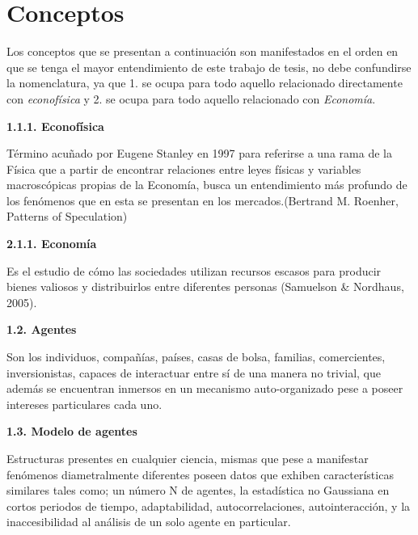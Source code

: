 %
\chapter{Conceptos}
\label{sec:related}





{
    \noindent
 Los conceptos que se presentan a continuación son manifestados en el orden en que se tenga el mayor entendimiento de este trabajo de tesis, no debe confundirse la nomenclatura, ya que 1. se ocupa para todo aquello relacionado directamente con \textit{econofísica} y 2. se ocupa para todo aquello relacionado con \textit{Economía}.\newline
}

{
\noindent
\Large \textbf{1.1.1. Econofísica}
}

Término acuñado por Eugene Stanley en 1997 para referirse a una rama de la Física que a partir de encontrar relaciones entre leyes físicas y variables macroscópicas propias de la Economía, busca un entendimiento más profundo de los fenómenos que en esta se presentan en los mercados.(Bertrand M. Roenher, Patterns of Speculation)
\newline

{
\noindent
\Large  \textbf{2.1.1. Economía} 
}

Es el estudio de cómo las sociedades utilizan recursos escasos para producir bienes valiosos y distribuirlos entre diferentes personas (Samuelson \& Nordhaus, 2005).
\newline

{
\noindent
\Large  \textbf{1.2. Agentes} 
}

Son los individuos, compañías, países, casas de bolsa, familias, comercientes, inversionistas, capaces de interactuar entre sí de una manera no trivial, que además se encuentran inmersos en un mecanismo auto-organizado pese a poseer intereses particulares cada uno.
\newpage

{
\noindent
\Large  \textbf{1.3. Modelo de agentes} 
}

Estructuras presentes en cualquier ciencia, mismas que pese a manifestar fenómenos diametralmente diferentes poseen datos que exhiben características similares tales como; un número N de agentes, la estadística no Gaussiana en cortos periodos de tiempo, adaptabilidad, autocorrelaciones, autointeracción, y la inaccesibilidad al análisis de un solo agente en particular.
\newline

